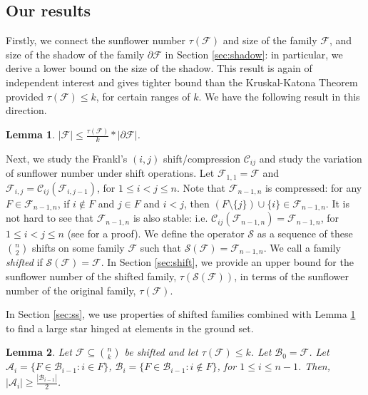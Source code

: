 \documentclass[runningheads,12pt,a4paper]{article}
\newtheorem{lemma}{Lemma}
\begin{document}
	\subsection*{Our results}
	Firstly, we connect the sunflower number $\tau(\mathcal{F})$ and size of the family $\mathcal{F}$, and size of the shadow of the family $\partial \mathcal{F}$ in Section \ref{sec:shadow}: in particular, we derive a lower bound on the size of the shadow. This result is again of independent interest and gives tighter bound than the Kruskal-Katona Theorem provided $\tau(\mathcal{F}) \leq k$, for certain ranges of $k$. We have the following result in this direction.
	\begin{lemma} \label{lemma:4}
		$|\mathcal F| \leq \frac{\tau(\mathcal F)}{k}*|\partial \mathcal F|$.
	\end{lemma} 
	Next, we study the Frankl's $(i,j)$ shift/compression
	$\mathcal{C}_{ij}$ and study the variation of sunflower number under shift operations. Let $\mathcal{F}_{1,1}=\mathcal{F}$ and $\mathcal{F}_{i,j}=\mathcal{C}_{ij}(\mathcal{F}_{i,j-1})$, for $1 \leq i< j \leq n$.  Note that $\mathcal{F}_{n-1,n}$ is compressed: for any $F \in \mathcal{F}_{n-1,n}$, if $i \notin F$ and $j \in F$ and $i<j$, then $(F \setminus \{j\}) \cup \{i\} \in \mathcal{F}_{n-1,n}$. It is not hard to see that $\mathcal{F}_{n-1,n}$ is also stable: i.e. $\mathcal{C}_{ij}(\mathcal{F}_{n-1,n})=\mathcal{F}_{n-1,n}$, for $1 \leq i< j \leq n$ (see \cite{frankl1987} for a proof). We define the operator $\mathcal S$ as a sequence of these $\binom{n}{2}$ shifts on some family  $\mathcal{F}$ such that $\mathcal{S}(\mathcal{F})=\mathcal{F}_{n-1,n}$.
	We call a family \emph{shifted} if  $\mathcal{S}(\mathcal{F})=\mathcal{F}$. In Section \ref{sec:shift}, we provide an upper bound for
	the sunflower number of the shifted family, $\tau(\mathcal{S}(\mathcal{F}))$, in terms of the sunflower number of the original family, $\tau(\mathcal{F})$. 

	In Section \ref{sec:ss}, we use properties of shifted families combined with Lemma \ref{lemma:4} to find a large star hinged at elements in the ground set.
	\begin{lemma} \label{lemma:5}
		Let $\mathcal{F} \subseteq \binom{n}{k}$ be shifted and  let $\tau(\mathcal{F}) \leq k$.
		Let $\mathcal{B}_0=\mathcal{F}$.
		Let $\mathcal{A}_i=\{F \in \mathcal{B}_{i-1} : i \in F\}$,
		$\mathcal{B}_i= \{F \in \mathcal{B}_{i-1} : i \notin F\}$, for $1 \leq i \leq n-1$. Then,
		$|\mathcal{A}_i| \geq \frac{|\mathcal{B}_{i-1}|}{2}$.
	\end{lemma}
	
\end{document}
